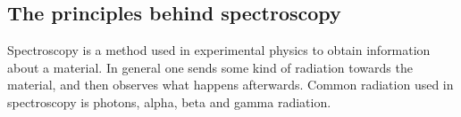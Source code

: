 \subsection*{The principles behind spectroscopy}
Spectroscopy is a method used in experimental physics to obtain information about a material.
In general one sends some kind of radiation towards the material, and then observes what happens afterwards.
Common radiation used in spectroscopy is photons, alpha, beta and gamma radiation.

